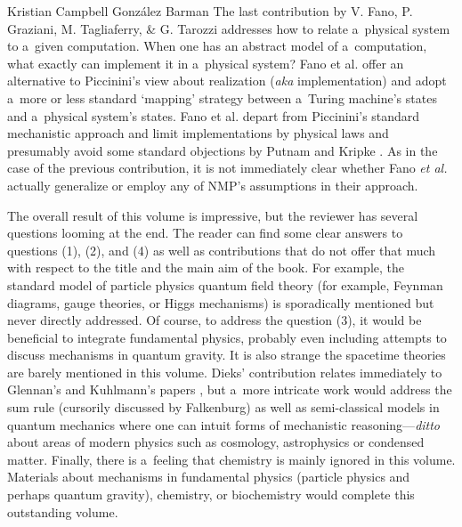 \begin{recengenv}{Kristian Campbell González Barman}
The last contribution by V. Fano, P. Graziani, M. Tagliaferry, \& G. Tarozzi addresses how to relate a~physical system to a~given computation. When one has an abstract model of a~computation, what exactly can implement it in a~physical system? Fano et al. offer an alternative to Piccinini's
\parencite*[][]{piccinini_physical_2015} %
 view about realization (\textit{aka} implementation) and adopt a~more or less standard ‘mapping' strategy between a~Turing machine's states and a~physical system's states. Fano et al. depart from Piccinini's standard mechanistic approach and limit implementations by physical laws and presumably avoid some standard objections by Putnam and Kripke 
\parencite*[][pp.217–218]{falkenburg_mechanistic_2019}. %
 As in the case of the previous contribution, it is not immediately clear whether Fano \textit{et al.} actually generalize or employ any of NMP's assumptions in their approach.

The overall result of this volume is impressive, but the reviewer has several questions looming at the end. The reader can find some clear answers to questions (1), (2), and (4) as well as contributions that do not offer that much with respect to the title and the main aim of the book. For example, the standard model of particle physics quantum field theory (for example, Feynman diagrams, gauge theories, or Higgs mechanisms) is sporadically mentioned but never directly addressed. Of course, to address the question (3), it would be beneficial to integrate fundamental physics, probably even including attempts to discuss mechanisms in quantum gravity. It is also strange the spacetime theories are barely mentioned in this volume. Dieks' contribution relates immediately to Glennan's and Kuhlmann's papers
\parencites[][]{kuhlmann_relation_2014}[][]{kuhlmann_mechanisms_2017}, %
 but a~more intricate work would address the sum rule (cursorily discussed by Falkenburg) as well as semi-classical models in quantum mechanics where one can intuit forms of mechanistic reasoning---\textit{ditto} about areas of modern physics such as cosmology, astrophysics or condensed matter. Finally, there is a~feeling that chemistry is mainly ignored in this volume. Materials about mechanisms in fundamental physics (particle physics and perhaps quantum gravity), chemistry, or biochemistry would complete this outstanding volume.
\enlargethispage{1.5\baselineskip}


\end{recengenv}
